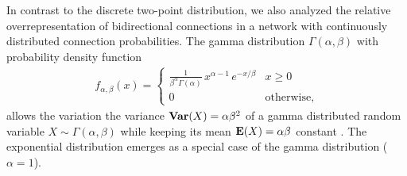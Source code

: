 
In contrast to the discrete two-point distribution, we also analyzed
the relative overrepresentation of bidirectional connections in a
network with continuously distributed connection probabilities. The
gamma distribution $\Gamma(\alpha, \beta)$ with probability density
function
\begin{align}
    f_{\alpha,\beta}(x) = \begin{cases} 
\frac{1}{\beta^{\alpha}\Gamma(\alpha)}\, x^{\alpha-1}\,e^{-x/\beta} & x \geq 0 \\
0 & \text{otherwise},
\end{cases}
\end{align}
allows the variation the variance $\operatorname{\mathbf{Var}}(X)= \alpha \beta^2 $ of a
gamma distributed random variable $X \sim \Gamma(\alpha, \beta)$ while
keeping its mean $\operatorname{\mathbf{E}}(X) = \alpha \beta $ constant \cite{Hogg1978}.
The exponential distribution emerges as a special case of the gamma
distribution ($\alpha =1$).

